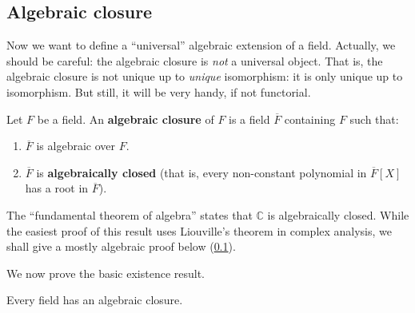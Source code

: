 \subsection{Algebraic closure}

Now we want to define a ``universal'' algebraic extension of a field. Actually,
we should be careful: the algebraic closure is \emph{not} a universal object.
That is, the algebraic closure is not unique up to \emph{unique} isomorphism:
it is only unique up to isomorphism. But still, it will be very handy, if not
functorial.


\begin{definition} 
Let $F$ be a field. An \textbf{algebraic closure} of $F$ is a field
$\overline{F}$ containing $F$ such that:
\begin{enumerate}[\textbf{AC} 1]
\item $\overline{F} $ is algebraic over $F$.
\item $\overline{F}$ is \textbf{algebraically closed} (that is, every
non-constant polynomial in $\overline{F}[X]$ has a root in $\overline{F}$).
\end{enumerate}
\end{definition} 

The ``fundamental theorem of algebra'' states that $\mathbb{C}$ is
algebraically closed. While the easiest proof of this result uses Liouville's
theorem in complex analysis, we shall give a mostly algebraic proof below
(\cref{}).

We now prove the basic existence result.


\begin{theorem}
Every field has an algebraic closure.
\end{theorem}


